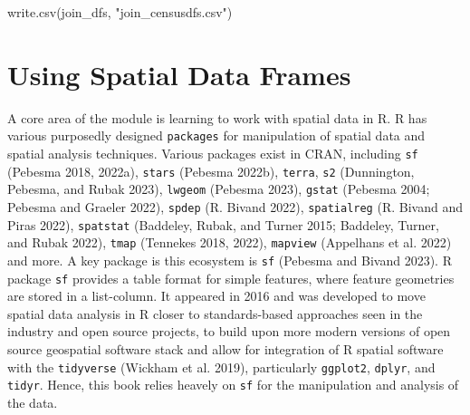 \documentclass[
  letterpaper,
  DIV=11,
  numbers=noendperiod,
  oneside]{scrreprt}
\newenvironment{Shaded}{\begin{snugshade}}{\end{snugshade}}
\newcommand{\FunctionTok}[1]{\textcolor[rgb]{0.28,0.35,0.67}{#1}}
\newcommand{\NormalTok}[1]{\textcolor[rgb]{0.00,0.23,0.31}{#1}}
\newcommand{\StringTok}[1]{\textcolor[rgb]{0.13,0.47,0.30}{#1}}
\begin{document}
\begin{Shaded}
\begin{Highlighting}[]
\FunctionTok{write.csv}\NormalTok{(join\_dfs, }\StringTok{"join\_censusdfs.csv"}\NormalTok{)}
\end{Highlighting}
\end{Shaded}

\section{Using Spatial Data Frames}\label{using-spatial-data-frames}

A core area of the module is learning to work with spatial data in R. R
has various purposedly designed \texttt{packages} for manipulation of
spatial data and spatial analysis techniques. Various packages exist in
CRAN, including \texttt{sf} (Pebesma 2018, 2022a), \texttt{stars}
(Pebesma 2022b), \texttt{terra}, \texttt{s2} (Dunnington, Pebesma, and
Rubak 2023), \texttt{lwgeom} (Pebesma 2023), \texttt{gstat} (Pebesma
2004; Pebesma and Graeler 2022), \texttt{spdep} (R. Bivand 2022),
\texttt{spatialreg} (R. Bivand and Piras 2022), \texttt{spatstat}
(Baddeley, Rubak, and Turner 2015; Baddeley, Turner, and Rubak 2022),
\texttt{tmap} (Tennekes 2018, 2022), \texttt{mapview} (Appelhans et al.
2022) and more. A key package is this ecosystem is \texttt{sf} (Pebesma
and Bivand 2023). R package \texttt{sf} provides a table format for
simple features, where feature geometries are stored in a list-column.
It appeared in 2016 and was developed to move spatial data analysis in R
closer to standards-based approaches seen in the industry and open
source projects, to build upon more modern versions of open source
geospatial software stack and allow for integration of R spatial
software with the \texttt{tidyverse} (Wickham et al. 2019), particularly
\texttt{ggplot2}, \texttt{dplyr}, and \texttt{tidyr}. Hence, this book
relies heavely on \texttt{sf} for the manipulation and analysis of the
data.

\end{document}
